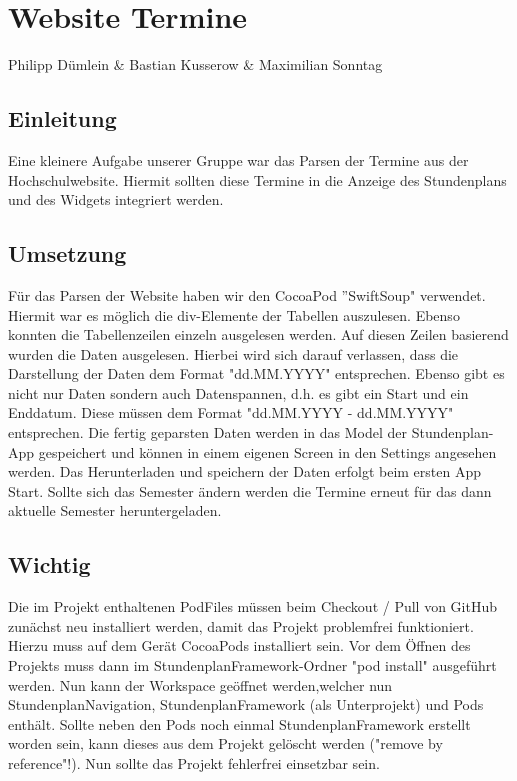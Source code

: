 \chapter{Website Termine}
Philipp Dümlein \& Bastian Kusserow \& Maximilian Sonntag

\section{Einleitung}
Eine kleinere Aufgabe unserer Gruppe war das Parsen der Termine aus der Hochschulwebsite. Hiermit sollten diese Termine in die Anzeige des Stundenplans und des Widgets integriert werden.

\section{Umsetzung}
Für das Parsen der Website haben wir den CocoaPod ''SwiftSoup" verwendet. Hiermit war es möglich die div-Elemente der Tabellen auszulesen. Ebenso konnten die Tabellenzeilen einzeln ausgelesen werden. Auf diesen Zeilen basierend wurden die Daten ausgelesen. Hierbei wird sich darauf verlassen, dass die Darstellung der Daten dem Format "dd.MM.YYYY" entsprechen. Ebenso gibt es nicht nur Daten sondern auch Datenspannen, d.h. es gibt ein Start und ein Enddatum. Diese müssen dem Format "dd.MM.YYYY - dd.MM.YYYY" entsprechen.
Die fertig geparsten Daten werden in das Model der Stundenplan-App gespeichert und können in einem eigenen Screen in den Settings angesehen werden.
Das Herunterladen und speichern der Daten erfolgt beim ersten App Start. Sollte sich das Semester ändern werden die Termine erneut für das dann aktuelle Semester heruntergeladen.

\section{Wichtig}
Die im Projekt enthaltenen PodFiles müssen beim Checkout / Pull von GitHub zunächst neu installiert werden, damit das Projekt problemfrei funktioniert. Hierzu muss auf dem Gerät CocoaPods installiert sein.
Vor dem Öffnen des Projekts muss dann im StundenplanFramework-Ordner "pod install" ausgeführt werden. Nun kann der Workspace geöffnet werden,welcher nun StundenplanNavigation, StundenplanFramework (als Unterprojekt) und Pods enthält. Sollte neben den Pods noch einmal StundenplanFramework erstellt worden sein, kann dieses aus dem Projekt gelöscht werden ("remove by reference"!). Nun sollte das Projekt fehlerfrei einsetzbar sein.
